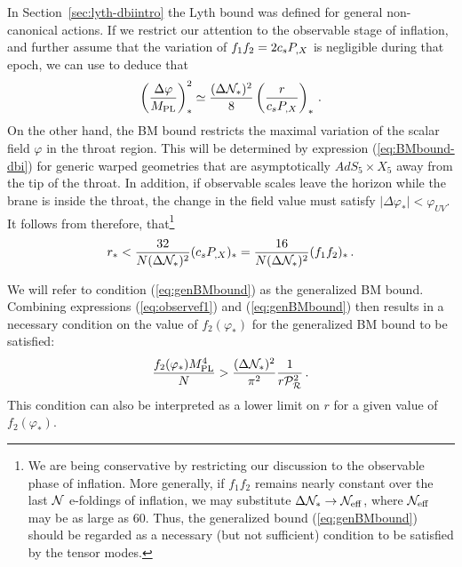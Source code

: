 In Section~\ref{sec:lyth-dbiintro} the Lyth bound was defined for general
non-canonical actions. 
If we restrict our attention to 
the observable stage of inflation, and further assume that the variation
of $f_1f_2 = 2 c_sP_{,X}$ is negligible during that epoch, we can use
 to deduce that 
% 
\begin{equation}
\label{eq:genphivary1}
\left( \frac{\Delta \varphi}{M_{\mathrm{PL}}} \right)^2_{*} \simeq 
\frac{(\Delta \mathcal{N}_{*} )^2}{8} \left(\frac{r}{c_sP_{,X}}\right)_*  \,.
\end{equation}
% 
On the other hand, the BM bound restricts the maximal 
variation of the scalar field $\varphi$ in the throat region. 
This will be determined by expression (\ref{eq:BMbound-dbi}) 
for generic warped geometries that are asymptotically 
$AdS_5 \times X_5$ away from the tip of the throat. In addition, 
if observable scales leave the horizon 
while the brane is inside the throat, the change in the field value 
must satisfy $| \Delta \varphi_*|<\varphi_{UV}$. It follows from   
 therefore, that\footnote{We are 
being conservative by restricting our discussion to the 
observable phase of inflation. More generally, if 
$f_1f_2$ remains nearly constant over the last $\mathcal{N}$ 
e-foldings of inflation, 
we may substitute $\Delta \mathcal{N}_* \rightarrow 
\mathcal{N}_\mathrm{eff}$, where $\mathcal{N}_\mathrm{eff}$ 
may be as large as 60. Thus, the generalized bound 
(\ref{eq:genBMbound}) should be regarded as a necessary 
(but not sufficient) condition to be satisfied by the tensor modes.} 
% 
\begin{equation}
\label{eq:genBMbound}
r_*< \frac{32}{N (\Delta \mathcal{N}_{*})^2} (c_sP_{,X})_* = \frac{16}{N (\Delta \mathcal{N}_{*})^2}
(f_1f_2)_* \,.
\end{equation}
% 


We will refer to condition 
(\ref{eq:genBMbound}) as the 
generalized BM bound. 
Combining expressions (\ref{eq:observef1}) and (\ref{eq:genBMbound}) then
results in a necessary condition on the value of $f_2(\varphi_*)$ 
for the generalized BM bound to be satisfied:
%  
\begin{equation}
\label{eq:f2bound}
\frac{f_2 (\varphi_*)M_{\mathrm{PL}}^4}{N} > \frac{(\Delta \mathcal{N}_*)^2}{\pi^2} 
\frac{1}{r\mathcal{P}_{\mathcal{R}}^2 } \,.
\end{equation}
% 
This condition can also be interpreted as a lower limit on $r$ 
for a given value of $f_2 (\varphi_*)$.  


